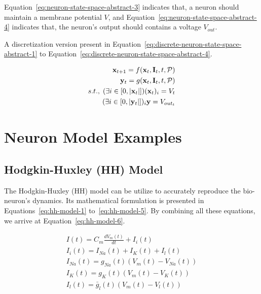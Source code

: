 Equation~\ref{eq:neuron-state-space-abstract-3} indicates that, a neuron should maintain a membrane potential $V$, 
and Equation~\ref{eq:neuron-state-space-abstract-4} indicates that, the neuron's output should contains a 
voltage $V_{out}$.

A discretization version present in Equation~\ref{eq:discrete-neuron-state-space-abstract-1} to 
Equation~\ref{eq:discrete-neuron-state-space-abstract-4}.

\begin{align}
    {\bold x}_{t + 1} = f(\bold x_t, \bold I_t, t, \mathcal P) \label{eq:discrete-neuron-state-space-abstract-1}  \\
    \bold y_t = g(\bold x_t, \bold I_t, t, \mathcal P) \label{eq:discrete-neuron-state-space-abstract-2} \\
    s.t.,\; (\exists i \in [0, |\bold x_t|])(\bold x_{t})_{i} = V_t \label{eq:discrete-neuron-state-space-abstract-3} \\
            (\exists i \in [0, |\bold y_t|])_i\bold y = V_{out_t} \label{eq:discrete-neuron-state-space-abstract-4}
\end{align}


\section{Neuron Model Examples}
\subsection{Hodgkin-Huxley (HH) Model}

The Hodgkin-Huxley (HH) model can be utilize to accurately 
reproduce the bio-neuron's dynamics. Its mathematical formulation is presented in
Equations~\ref{eq:hh-model-1} to~\ref{eq:hh-model-5}.
By combining all these equations, we arrive at Equation~\ref{eq:hh-model-6}.

\begin{align}
    I(t) = C_m\frac{dV_m(t)}{dt} + I_{i}(t) \label{eq:hh-model-1} \\
    I_i(t) = I_{Na}(t) + I_K(t) + I_l(t) \label{eq:hh-model-2}  \\
    I_{Na}(t) = g_{Na}(t)(V_m(t) - V_{Na}(t)) \label{eq:hh-model-3} \\
    I_K(t) = g_{K}(t)(V_m(t) - V_{K}(t)) \label{eq:hh-model-4}  \\
    I_l(t) = \bar g_{l}(t)(V_m(t) - V_{l}(t)) \label{eq:hh-model-5} 
\end{align}

